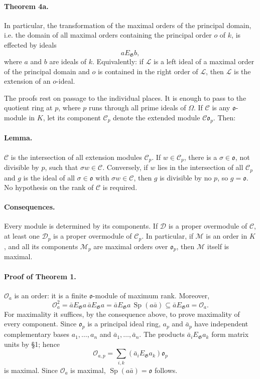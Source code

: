 \documentclass[11pt]{article}
\providecommand{\Sp}{\operatorname{Sp}}
\providecommand{\Gg}{\mathfrak G}
\providecommand{\oo}{\mathfrak o}
\begin{document}
\paragraph{Theorem 4a.}
In particular, the transformation of the maximal orders of the principal domain, i.e. the domain of all maximal orders containing the principal order \(o\) of \(k\), is effected by ideals
\[
        aE_\Gg b,
\]
where \(a\) and \(b\) are ideals of \(k\). Equivalently: if \(\mathcal L\) is a left ideal of a maximal order of the principal domain and \(o\) is contained in the right order of \(\mathcal L\), then \(\mathcal L\) is the extension of an \(o\)-ideal.

The proofs rest on passage to the individual places. It is enough to pass to the quotient ring at \(p\), where \(p\) runs through all prime ideals of \(\Omega\). If \(\mathcal C\) is any \(\oo\)-module in \(K\), let its component \(\mathcal C_p\) denote the extended module \(\mathcal C\oo_p\). Then:

\paragraph{Lemma.}
\(\mathcal C\) is the intersection of all extension modules \(\mathcal C_p\). If \(w\in\mathcal C_p\), there is a \(\sigma\in\oo\), not divisible by \(p\), such that \(\sigma w\in\mathcal C\). Conversely, if \(w\) lies in the intersection of all \(\mathcal C_p\) and \(g\) is the ideal of all \(\sigma\in\oo\) with \(\sigma w\in\mathcal C\), then \(g\) is divisible by no \(p\), so \(g=\oo\). No hypothesis on the rank of \(\mathcal C\) is required.

\paragraph{Consequences.}
Every module is determined by its components. If \(\mathcal D\) is a proper overmodule of \(\mathcal C\), at least one \(\mathcal D_p\) is a proper overmodule of \(\mathcal C_p\). In particular, if \(\mathcal M\) is an order in \(K\), and all its components \(\mathcal M_p\) are maximal orders over \(\oo_p\), then \(\mathcal M\) itself is maximal.

\paragraph{Proof of Theorem 1.}
\(\mathcal O_a\) is an order: it is a finite \(\oo\)-module of maximum rank. Moreover,
\[
        \mathcal O_a^2
        =\bar aE_\Gg a\,\bar aE_\Gg a
        =\bar aE_\Gg a\,\Sp(a\bar a)
        \subseteq \bar aE_\Gg a=\mathcal O_a.
\]
For maximality it suffices, by the consequence above, to prove maximality of every component. Since \(\oo_p\) is a principal ideal ring, \(a_p\) and \(\bar a_p\) have independent complementary bases \(a_1,\ldots,a_n\) and \(\bar a_1,\ldots,\bar a_n\). The products \(\bar a_iE_\Gg a_k\) form matrix units by §1; hence
\[
        \mathcal O_{a,p}=\sum_{i,k}(\bar a_iE_\Gg a_k)\oo_p
\]
is maximal. Since \(\mathcal O_a\) is maximal, \(\Sp(a\bar a)=\oo\) follows.
\end{document}
